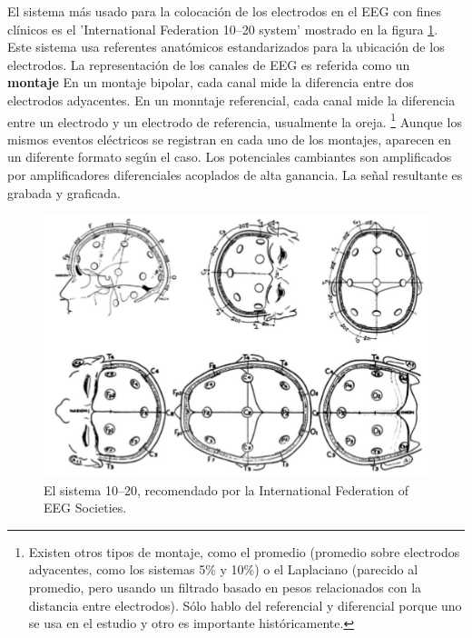 El sistema m\'as usado para la colocaci\'on de los electrodos en el EEG con fines cl\'inicos es el 
'International Federation 10--20 system' \cite{Jasper58,AASM07} mostrado en la figura \ref{img1020}. 
Este sistema usa 
referentes anat\'omicos estandarizados para la ubicaci\'on de los electrodos.
La representaci\'on de los canales de EEG es referida como un \textbf{montaje}
En un montaje bipolar, cada canal mide la diferencia entre dos electrodos adyacentes.
En un monntaje referencial, cada canal mide la diferencia entre un electrodo y un electrodo
de referencia, usualmente la oreja.
\footnote{Existen otros tipos de montaje, como el promedio (promedio sobre electrodos adyacentes,
como los sistemas 5\% y 10\%) o el Laplaciano (parecido al promedio, pero usando un filtrado
basado en pesos relacionados con la distancia entre electrodos). S\'olo hablo del referencial
y diferencial porque uno se usa en el estudio y otro es importante hist\'oricamente.}
Aunque los mismos eventos el\'ectricos se registran en cada uno de los montajes,
aparecen en un diferente formato seg\'un el caso. Los potenciales cambiantes
son amplificados por amplificadores diferenciales acoplados de alta ganancia.
La se\~nal resultante es grabada y graficada.

\begin{figure}
\centering
\includegraphics[width=0.8\linewidth]{figura_6.png} 
\caption{El sistema 10--20, recomendado por la
International Federation of EEG Societies. 
}
\label{img1020}
\end{figure}

